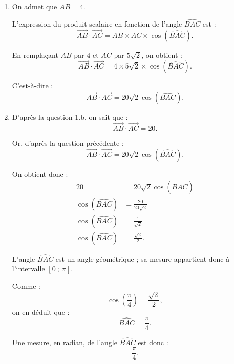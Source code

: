 \documentclass[10pt]{article}
\begin{document}
\begin{enumerate}
\begin{enumerate}
On a :
\begin{align*}
AC
&=\sqrt{(x_C-x_A)^2+(y_C-y_A)^2}\\
&=\sqrt{(4-(-1))^2+(0-5)^2}\\
&=\sqrt{5^2+(-5)^2}\\
&=\sqrt{25+25}\\
&=\sqrt{50}\\
&=\sqrt{25\times 2}\\
&=5\sqrt{2}.
\end{align*}

Donc :
\[
AC=5\sqrt{2}.
\]

\item On admet que $AB=4$.

L'expression du produit scalaire en fonction de l'angle $\widehat{BAC}$ est :
\[
\overrightarrow{AB}\cdot\overrightarrow{AC}
=AB\times AC\times \cos\left(\widehat{BAC}\right).
\]

En remplaçant $AB$ par $4$ et $AC$ par $5\sqrt{2}$, on obtient :
\[
\overrightarrow{AB}\cdot\overrightarrow{AC}
=4\times 5\sqrt{2}\times \cos\left(\widehat{BAC}\right).
\]

C'est-à-dire :
\[
\overrightarrow{AB}\cdot\overrightarrow{AC}
=20\sqrt{2}\cos\left(\widehat{BAC}\right).
\]

\item D'après la question 1.b, on sait que :
\[
\overrightarrow{AB}\cdot\overrightarrow{AC}=20.
\]

Or, d'après la question précédente :
\[
\overrightarrow{AB}\cdot\overrightarrow{AC}
=20\sqrt{2}\cos\left(\widehat{BAC}\right).
\]

On obtient donc :
\begin{align*}
20&=20\sqrt{2}\cos\left(\widehat{BAC}\right)\\
\cos\left(\widehat{BAC}\right)&=\frac{20}{20\sqrt{2}}\\
\cos\left(\widehat{BAC}\right)&=\frac{1}{\sqrt{2}}\\
\cos\left(\widehat{BAC}\right)&=\frac{\sqrt{2}}{2}.
\end{align*}

L'angle $\widehat{BAC}$ est un angle géométrique ; sa mesure appartient donc à l'intervalle $[0\ ;\ \pi]$.

Comme :
\[
\cos\left(\frac{\pi}{4}\right)=\frac{\sqrt{2}}{2},
\]
on en déduit que :
\[
\widehat{BAC}=\frac{\pi}{4}.
\]

Une mesure, en radian, de l'angle $\widehat{BAC}$ est donc :
\[
\boxed{\frac{\pi}{4}}.
\]
\end{enumerate}
\end{enumerate}

\clearpage
\end{document}
